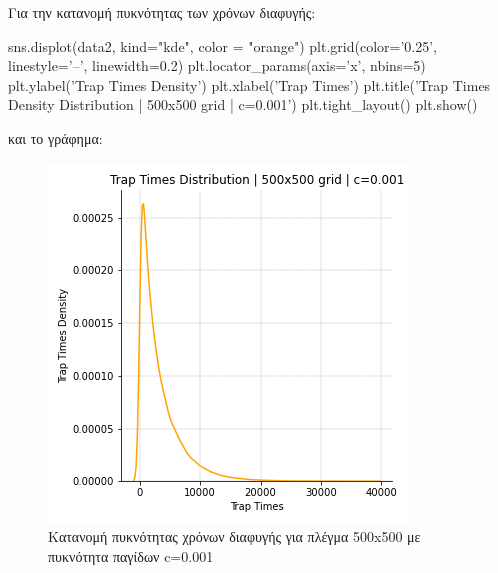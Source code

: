 \newpage
\noindent
Για την κατανομή πυκνότητας των χρόνων διαφυγής:
\en 
\begin{python}
sns.displot(data2, kind="kde", color = "orange")
plt.grid(color='0.25', linestyle='--', linewidth=0.2)
plt.locator_params(axis='x', nbins=5)
plt.ylabel('Trap Times Density')
plt.xlabel('Trap Times')
plt.title('Trap Times Density Distribution | 500x500 grid | c=0.001')
plt.tight_layout()
plt.show()
\end{python}
\gr και το γράφημα:
\begin{figure}[H]
\begin{center}
\includegraphics[scale=0.7]{figures/TRW_0001_dens.png}
\caption{Κατανομή πυκνότητας χρόνων διαφυγής για πλέγμα 500{\en x}500 με πυκνότητα παγίδων {\en c}=0.001}
\label{figuridion3d}
\end{center}
\end{figure}
